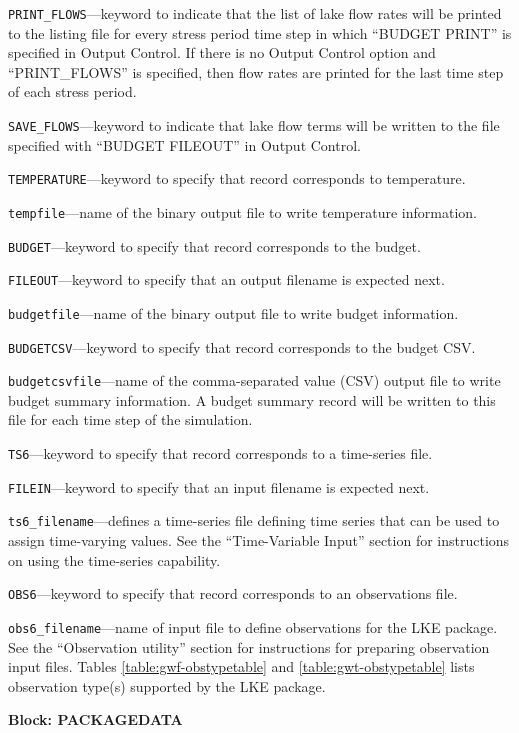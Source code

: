 \begin{description}
\item \texttt{PRINT\_FLOWS}---keyword to indicate that the list of lake flow rates will be printed to the listing file for every stress period time step in which ``BUDGET PRINT'' is specified in Output Control.  If there is no Output Control option and ``PRINT\_FLOWS'' is specified, then flow rates are printed for the last time step of each stress period.

\item \texttt{SAVE\_FLOWS}---keyword to indicate that lake flow terms will be written to the file specified with ``BUDGET FILEOUT'' in Output Control.

\item \texttt{TEMPERATURE}---keyword to specify that record corresponds to temperature.

\item \texttt{tempfile}---name of the binary output file to write temperature information.

\item \texttt{BUDGET}---keyword to specify that record corresponds to the budget.

\item \texttt{FILEOUT}---keyword to specify that an output filename is expected next.

\item \texttt{budgetfile}---name of the binary output file to write budget information.

\item \texttt{BUDGETCSV}---keyword to specify that record corresponds to the budget CSV.

\item \texttt{budgetcsvfile}---name of the comma-separated value (CSV) output file to write budget summary information.  A budget summary record will be written to this file for each time step of the simulation.

\item \texttt{TS6}---keyword to specify that record corresponds to a time-series file.

\item \texttt{FILEIN}---keyword to specify that an input filename is expected next.

\item \texttt{ts6\_filename}---defines a time-series file defining time series that can be used to assign time-varying values. See the ``Time-Variable Input'' section for instructions on using the time-series capability.

\item \texttt{OBS6}---keyword to specify that record corresponds to an observations file.

\item \texttt{obs6\_filename}---name of input file to define observations for the LKE package. See the ``Observation utility'' section for instructions for preparing observation input files. Tables \ref{table:gwf-obstypetable} and \ref{table:gwt-obstypetable} lists observation type(s) supported by the LKE package.

\end{description}
\item \textbf{Block: PACKAGEDATA}

